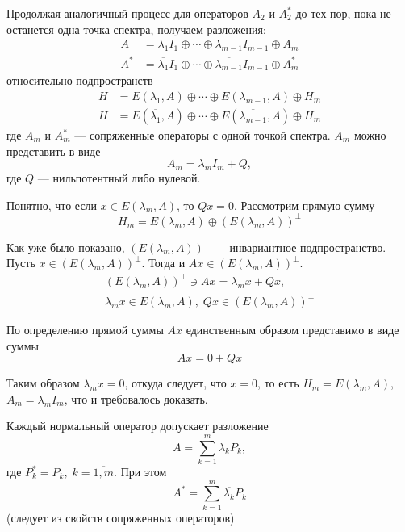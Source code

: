 \begin{proofbreak}
    Продолжая аналогичный процесс для операторов $A_2$ и $A_2^*$ до тех пор,
    пока не останется одна точка спектра, получаем разложения:
    \begin{align*}
        A &= \lambda_1 I_1 \oplus \dotsb \oplus \lambda_{m-1} I_{m-1} \oplus A_m
        \\
        A^* &= \overline{\lambda_1} I_1 \oplus \dotsb \oplus
        \overline{\lambda_{m-1}} I_{m-1} \oplus A_m^*
    \end{align*}
    относительно подпространств
    \begin{align*}
        H &= E(\lambda_1,A) \oplus \dotsb \oplus E(\lambda_{m-1}, A) \oplus H_m
        \\
        H &= E(\overline{\lambda_1},A) \oplus \dotsb \oplus
        E(\overline{\lambda_{m-1}}, A) \oplus H_m
    \end{align*}
    где $A_m$ и $A_m^*$ — сопряженные операторы с одной точкой спектра. $A_m$ можно представить в виде
    \[ A_m = \lambda_m I_m + Q, \]
    где $Q$ — нильпотентный либо нулевой. 
    
    Понятно, что если $x \in E(\lambda_m, A)$, то $Qx = 0$. Рассмотрим прямую
    сумму
    \[ H_m = E(\lambda_m, A) \oplus (E(\lambda_m,A))^\perp \]

    Как уже было показано, $(E(\lambda_m, A))^\perp$ — инвариантное
    подпространство. Пусть $x \in (E(\lambda_m, A))^\perp$. Тогда и $Ax \in
    (E(\lambda_m, A))^\perp$.
    \begin{gather*}
        (E(\lambda_m, A))^\perp \ni Ax = \lambda_m x + Qx,\\
        \lambda_m x \in E(\lambda_m, A), \; Qx \in (E(\lambda_m,A))^\perp
    \end{gather*}

    По определению прямой суммы $Ax$ единственным образом представимо в виде
    суммы
    \[ Ax = 0 + Qx \]

    Таким образом $\lambda_m x = 0$, откуда следует, что $x = 0$, то есть
    $H_m = E(\lambda_m, A)$, $A_m = \lambda_m I_m$, что и требовалось доказать.
\end{proofbreak}

\begin{corollaryth}
    Каждый нормальный оператор допускает разложение
    \[ A = \sum_{k=1}^m \lambda_k P_k, \]
    где $P_k^* = P_k, \; k = \overline{1,m}$. При этом
    \[ A^* = \sum_{k=1}^m \overline{\lambda_k} P_k \]
    (следует из свойств сопряженных операторов)
\end{corollaryth}

